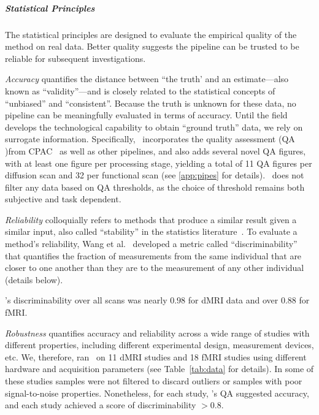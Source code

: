 \documentclass[11pt]{article}
\begin{document}
\begin{multicols}{2}
\subparagraph*{Statistical Principles}
The statistical principles are designed to evaluate the empirical quality of the method on real data. Better quality suggests the pipeline can be trusted to be reliable for subsequent investigations. 

\emph{Accuracy} quantifies the distance between ``the truth' and an estimate---also known as ``validity''---and is closely related to the statistical concepts of ``unbiased'' and ``consistent''.  
Because the truth is unknown for these data, no pipeline can be meaningfully evaluated in terms of accuracy. Until the field develops the technological capability to obtain ``ground truth'' data, we rely on surrogate information. 
Specifically, %
\ndmg~incorporates the quality assessment (QA )from CPAC~\cite{cpac} as well as other pipelines, and also adds several novel QA figures, with at least one figure per processing stage, yielding a total of 11 QA figures per diffusion scan and 32 per functional scan (see \ref{app:pipes} for details). \ndmg~does not filter any data based on QA thresholds, as the choice of threshold remains both subjective and task dependent.

\emph{Reliability} colloquially refers to methods that produce a similar result given a similar input, also called ``stability'' in the statistics literature~\cite{Yu2013}.
To evaluate a method's reliability, Wang et al.~\cite{discriminability} developed a metric  called ``discriminability'' that quantifies the fraction of measurements from the same individual that are closer to one another than they are to the measurement of any other individual (details below). 

\ndmg's discriminability over all scans was nearly $0.98$ for dMRI data and over $0.88$ for fMRI. 

\emph{Robustness} quantifies accuracy and reliability across a wide range of studies with different properties, including different experimental design, measurement devices, etc.  
We, therefore, ran \ndmg~on 11 dMRI studies and 18 fMRI studies using different hardware and acquisition parameters (see Table~\ref{tab:data} for details). In some of these studies samples were not  filtered to discard outliers or samples with poor signal-to-noise properties. Nonetheless, for each study, \ndmg's QA suggested accuracy, and each study achieved a score of discriminability $>0.8$. 


\end{multicols}
\end{document}
